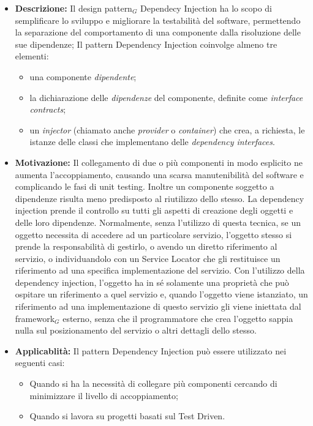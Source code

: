 \begin{itemize}
\item \textbf{Descrizione:} Il design pattern$_G$ Dependecy Injection ha lo scopo di semplificare lo sviluppo e migliorare la testabilità del software, permettendo la separazione del comportamento di una componente dalla risoluzione delle sue dipendenze;
Il pattern Dependency Injection coinvolge almeno tre elementi:

\begin{itemize}
\item una componente \textit{dipendente};
\item la dichiarazione delle \textit{dipendenze} del componente, definite come \textit{interface contracts};
\item un \textit{injector} (chiamato anche \textit{provider} o \textit{container}) che crea, a richiesta, le istanze delle classi che implementano delle \textit{dependency interfaces}.
\end{itemize}

\item \textbf{Motivazione:} Il collegamento di due o più componenti in modo esplicito ne aumenta l'accoppiamento, causando una scarsa manutenibilità del software e complicando le fasi di unit testing.
Inoltre un componente soggetto a dipendenze risulta meno predisposto al riutilizzo dello stesso.
La dependency injection prende il controllo su tutti gli aspetti di creazione degli oggetti e delle loro dipendenze. Normalmente, senza l'utilizzo di questa tecnica, se un oggetto necessita di accedere ad un particolare servizio, l'oggetto stesso si prende la responsabilità di gestirlo, o avendo un diretto riferimento al servizio, o individuandolo con un Service Locator che gli restituisce un riferimento ad una specifica implementazione del servizio. 
Con l'utilizzo della dependency injection, l'oggetto ha in sé solamente una proprietà che può ospitare un riferimento a quel servizio e, quando l'oggetto viene istanziato, un riferimento ad una implementazione di questo servizio gli viene iniettata dal framework$_G$ esterno, senza che il programmatore che crea l'oggetto sappia nulla sul posizionamento del servizio o altri dettagli dello stesso.
\item \textbf{Applicablità:} Il pattern Dependency Injection può essere utilizzato nei seguenti casi:

\begin{itemize}
\item Quando si ha la necessità di collegare più componenti cercando di minimizzare il livello di accoppiamento;
\item Quando si lavora su progetti basati sul Test Driven.
\end{itemize}

\end{itemize}

